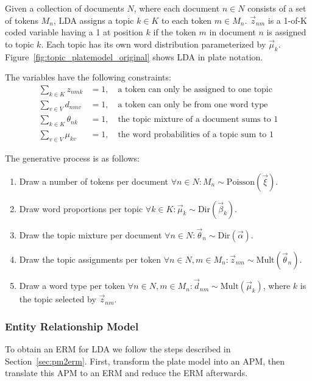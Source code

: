 Given a collection of documents $N$, where each document $n \in N$ consists of a set of tokens $M_n$, LDA assigns a topic $k \in K$ to each token $m \in M_n$. $\vec z_{nm}$ is a 1-of-K coded variable having a 1 at position $k$ if the token $m$ in document $n$ is assigned to topic $k$. Each topic has its own word distribution parameterized by $\vec \mu_k$. Figure~\ref{fig:topic_platemodel_original} shows LDA in plate notation.

The variables have the following constraints:
\begin{align}
\sum_{k \in K} z_{nmk} &= 1,\quad \text{a token can only be assigned to one topic}\\
\sum_{v \in V} d_{nmv} &= 1,\quad \text{a token can only be from one word type}\\
\sum_{k \in K} \theta_{nk} &= 1,\quad \text{the topic mixture of a document sums to 1}\\
\sum_{v \in V} \mu_{kv} &= 1,\quad \text{the word probabilities of a topic sum to 1}
\end{align}

The generative process is as follows:
\begin{enumerate}
\item Draw a number of tokens per document $\forall n \in N: M_n \sim \text{Poisson}(\vec \xi)$.
\item Draw word proportions per topic $\forall k \in K: \vec \mu_k \sim \text{Dir}(\vec \beta_k)$.
\item Draw the topic mixture per document $\forall n \in N: \vec \theta_n \sim \text{Dir}(\vec \alpha)$.
\item Draw the topic assignments per token $\forall n \in N, m \in M_n: \vec z_{nm} \sim \text{Mult}(\vec \theta_n)$.
\item Draw a word type per token $\forall n \in N, m \in M_n: \vec d_{nm} \sim \text{Mult}(\vec \mu_k)$, where $k$ is the topic selected by $\vec z_{nm}$.
\end{enumerate}

\subsubsection{Entity Relationship Model}

To obtain an ERM for LDA we follow the steps described in Section~\ref{sec:pm2erm}. First, transform the plate model into an APM, then translate this APM to an ERM and reduce the ERM afterwards.

